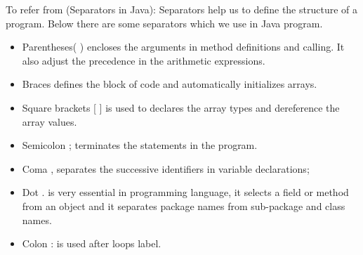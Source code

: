\documentclass{report}
\begin{document}
To refer from \cite{JavaProceduralSyntax}(Separators in Java): Separators help us to define the structure of a program. Below there are some separators which we use in Java program.
\begin{itemize}

\item Parentheses( ) encloses the arguments in method definitions and calling. It also adjust the precedence in the arithmetic expressions.
\item Braces { } defines the block of code and automatically initializes arrays.
\item Square brackets [ ] is used to declares the array types and dereference the array values.
\item Semicolon ; terminates the statements in the program.
\item Coma , separates the successive identifiers in variable declarations; 
\item Dot . is very essential in programming language, it selects a field or method from an object and it separates package names from sub-package and class names.
\item Colon : is used after loops label.

\end{itemize}







\end{document}
